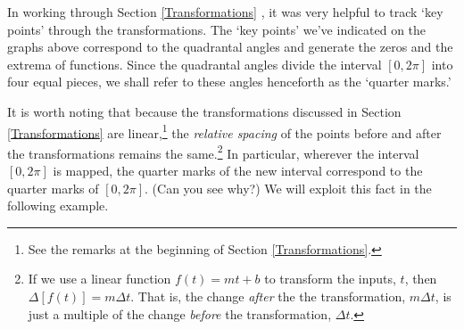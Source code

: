 In working through Section \ref{Transformations} , it was very helpful to track `key points' through  the transformations.  The `key points' we've indicated on the graphs above correspond to the quadrantal angles and generate the zeros and the extrema of functions. Since the quadrantal angles divide the interval $[0,2\pi]$ into four equal pieces, we shall refer to these angles henceforth  as the  `quarter marks.'    

\smallskip

It is worth noting that because the transformations discussed in Section \ref{Transformations} are linear,\footnote{See the remarks at the beginning of Section \ref{Transformations}.}  the \textit{relative spacing} of the points before and after the transformations remains the same.\footnote{If we use a linear function $f(t) = mt + b$ to transform the inputs, $t$, then  $\Delta[f(t)] = m \Delta t$.  That is, the change \textit{after} the the transformation, $m \Delta t$, is just a multiple of the change \textit{before} the transformation, $\Delta t$.}  In particular, wherever the interval $[0, 2\pi]$ is mapped, the quarter marks of the new interval correspond to the quarter marks of $[0, 2\pi]$.  (Can you see why?) We will exploit this fact in the following example.


